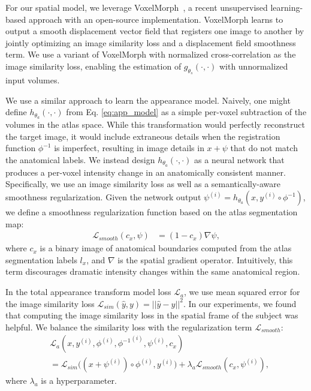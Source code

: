 \documentclass[10pt,twocolumn,letterpaper]{article}
\begin{document}
For our spatial model, we leverage VoxelMorph~\cite{balakrishnan2018unsupervised,balakrishnan2019voxelmorph,dalca2018unsupervised}, a recent unsupervised learning-based approach with an open-source implementation. VoxelMorph learns to output a smooth displacement vector field that registers one image to another by jointly optimizing an image similarity loss and a displacement field smoothness term. We use a variant of VoxelMorph with normalized cross-correlation as the image similarity loss, enabling the estimation of $g_{\theta_s}(\cdot,\cdot)$ with unnormalized input volumes. 

We use a similar approach to learn the appearance model. Naively, one might define $h_{\theta_a}(\cdot, \cdot)$ from Eq. \eqref{eq:app_model} as a simple per-voxel subtraction of the volumes in the atlas space. While this transformation would perfectly reconstruct the target image, it would include extraneous details when the registration function $\phi^{-1}$ is imperfect, resulting in image details in $x + \psi$ that do not match the anatomical labels. We instead design $h_{\theta_a}(\cdot, \cdot)$ as a neural network that produces a per-voxel intensity change in an anatomically consistent manner. Specifically, we use an image similarity loss as well as a semantically-aware smoothness regularization. Given the network output $\psi^{(i)} = h_{\theta_a}(x, y^{(i)}\circ \phi^{-1})$, we define a smoothness regularization function based on the atlas segmentation map:
\vspace{-2pt}
\begin{align}
\mathcal{L}_{smooth}(c_x,\psi) &= (1-c_x)\nabla \psi,
\end{align}
where $c_x$ is a binary image of anatomical boundaries computed from the atlas segmentation labels $l_x$, and $\nabla$ is the spatial gradient operator. Intuitively, this term discourages dramatic intensity changes within the same anatomical region. 

In the total appearance transform model loss $\mathcal{L}_a$, we use mean squared error for the image similarity loss $\mathcal{L}_{sim}(\hat{y}, y)=||\hat{y} - y||^2$. In our experiments, we found that computing the image similarity loss in the spatial frame of the subject was helpful. We balance the similarity loss with the regularization term  $\mathcal{L}_{smooth}$:
\vspace{-1pt}
\begin{align*}
&\mathcal{L}_{a}(x,y^{(i)}, \phi^{(i)}, {\phi^{-1}}^{(i)},\psi^{(i)}, c_x) \\
&= \mathcal{L}_{sim}\big((x + \psi^{(i)}) \circ \phi^{(i)}, y^{(i)}\big) + \lambda_a \mathcal{L}_{smooth}(c_x,\psi^{(i)}),
\end{align*}
where $\lambda_a$ is a hyperparameter.
\end{document}
